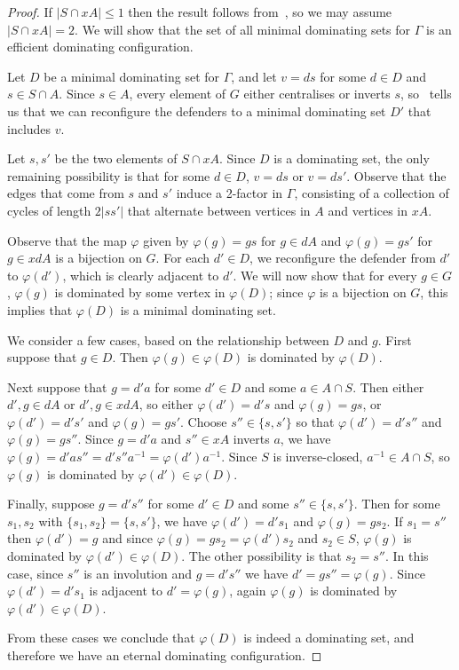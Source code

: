 \documentclass{amsart}
\theoremstyle{remark}
\theoremstyle{definition}
\begin{document}
\begin{proof}
    If $|S \cap xA|\le 1$ then the result follows from~, so we may assume $|S\cap xA|=2$. We will show that the set of all minimal dominating sets for $\Gamma$ is an efficient dominating configuration.

    Let $D$ be a minimal dominating set for $\Gamma$, and let $v=ds$ for some $d \in D$ and $s \in S \cap A$. Since $s \in A$, every element of $G$ either centralises or inverts $s$, so~ tells us that we can reconfigure the defenders to a minimal dominating set $D'$ that includes $v$.

    Let $s,s'$ be the two elements of $S \cap xA$. Since $D$ is a dominating set, the only remaining possibility is that for some $d \in D$, $v=ds$ or $v=ds'$. Observe that the edges that come from $s$ and $s'$ induce a 2-factor in $\Gamma$, consisting of a collection of cycles of length $2|ss'|$ that alternate between vertices in $A$ and vertices in $xA$. 

    Observe that the map $\varphi$ given by $\varphi(g)=gs$ for $g \in dA$ and $\varphi(g)=gs'$ for $g \in xdA$ is a bijection on $G$.
    For each $d' \in D$, we reconfigure the defender from $d'$ to $\varphi(d')$, which is clearly adjacent to $d'$. We will now show that for every $g \in G$, $\varphi(g)$ is dominated by some vertex in $\varphi(D)$; since $\varphi$ is a bijection on $G$, this implies that $\varphi(D)$ is a minimal dominating set.

    We consider a few cases, based on the relationship between $D$ and $g$. First suppose that $g \in D$. Then $\varphi(g)\in \varphi(D)$ is dominated by $\varphi(D)$.

    Next suppose that $g=d'a$ for some $d' \in D$ and some $a \in A \cap S$. Then either $d',g \in dA$ or $d',g \in xdA$, so either $\varphi(d')=d's$ and $\varphi(g)=gs$, or $\varphi(d')=d's'$ and $\varphi(g)=gs'$. Choose $s'' \in \{s,s'\}$ so that $\varphi(d')=d's''$ and $\varphi(g)=gs''$. Since $g=d'a$ and $s'' \in xA$ inverts $a$, we have $\varphi(g)=d'as''=d's''a^{-1}=\varphi(d')a^{-1}$. Since $S$ is inverse-closed, $a^{-1} \in A \cap S$, so $\varphi(g)$ is dominated by $\varphi(d') \in \varphi(D)$.

    Finally, suppose $g=d's''$ for some $d' \in D$ and some $s'' \in \{s,s'\}$. Then for some $s_1, s_2$ with $\{s_1,s_2\}=\{s, s'\}$, we have $\varphi(d')=d's_1$ and $\varphi(g)=gs_2$. If $s_1=s''$ then $\varphi(d')=g$ and since $\varphi(g)=gs_2=\varphi(d')s_2$ and $s_2\in S$, $\varphi(g)$ is dominated by $\varphi(d') \in \varphi(D)$. The other possibility is that $s_2=s''$. In this case, since $s''$ is an involution and $g=d's''$ we have $d'=gs''=\varphi(g)$. Since $\varphi(d')=d's_1$ is adjacent to $d'=\varphi(g)$, again $\varphi(g)$ is dominated by $\varphi(d') \in \varphi(D)$. 

    From these cases we conclude that $\varphi(D)$ is indeed a dominating set, and therefore we have an eternal dominating configuration.
\end{proof}
\end{document}
